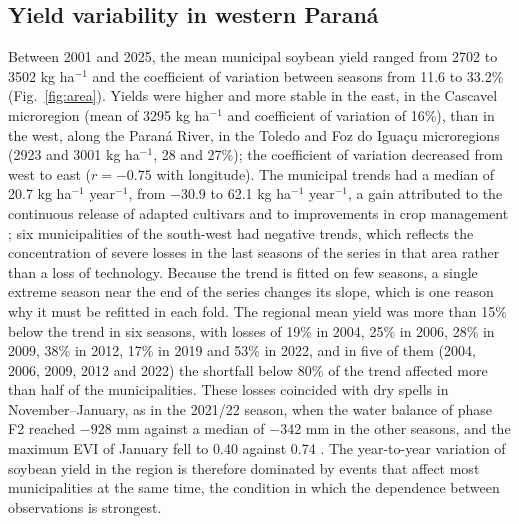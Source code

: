 \documentclass[pdflatex,sn-basic]{sn-jnl}
\begin{document}
\subsection{Yield variability in western Paraná}\label{sec:res_area}
Between 2001 and 2025, the mean municipal soybean yield ranged from 2702 to 3502 kg ha$^{-1}$ and the coefficient of variation between seasons from 11.6 to 33.2\% (Fig.~\ref{fig:area}). Yields were higher and more stable in the east, in the Cascavel microregion (mean of 3295 kg ha$^{-1}$ and coefficient of variation of 16\%), than in the west, along the Paraná River, in the Toledo and Foz do Iguaçu microregions (2923 and 3001 kg ha$^{-1}$, 28 and 27\%); the coefficient of variation decreased from west to east ($r = -0.75$ with longitude). The municipal trends had a median of 20.7 kg ha$^{-1}$ year$^{-1}$, from $-30.9$ to 62.1 kg ha$^{-1}$ year$^{-1}$, a gain attributed to the continuous release of adapted cultivars and to improvements in crop management \citep{Cattelan2018,gazzoni2018saga}; six municipalities of the south-west had negative trends, which reflects the concentration of severe losses in the last seasons of the series in that area rather than a loss of technology. Because the trend is fitted on few seasons, a single extreme season near the end of the series changes its slope, which is one reason why it must be refitted in each fold. The regional mean yield was more than 15\% below the trend in six seasons, with losses of 19\% in 2004, 25\% in 2006, 28\% in 2009, 38\% in 2012, 17\% in 2019 and 53\% in 2022, and in five of them (2004, 2006, 2009, 2012 and 2022) the shortfall below 80\% of the trend affected more than half of the municipalities. These losses coincided with dry spells in November--January, as in the 2021/22 season, when the water balance of phase F2 reached $-928$ mm against a median of $-342$ mm in the other seasons, and the maximum EVI of January fell to 0.40 against 0.74 \citep{idrparana2022}. The year-to-year variation of soybean yield in the region is therefore dominated by events that affect most municipalities at the same time, the condition in which the dependence between observations is strongest.
\end{document}
